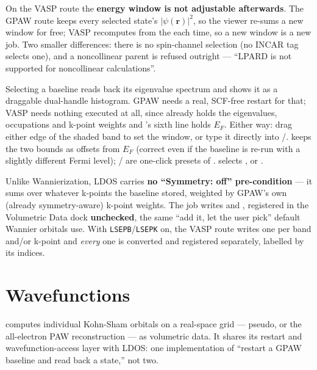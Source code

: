 \begin{calwarn}
On the VASP route the \textbf{energy window is not adjustable afterwards}.
The GPAW route keeps every selected state's $|\psi(\mathbf{r})|^2$, so the
viewer re-sums a new window for free; VASP recomputes from the
 each time, so a new window is a new job. Two smaller
differences: there is no spin-channel selection (no INCAR tag selects one),
and a noncollinear parent is refused outright --- ``LPARD is not supported
for noncollinear calculations''.
\end{calwarn}

Selecting a baseline reads back its eigenvalue spectrum and shows it as a
draggable dual-handle histogram. GPAW needs a real, SCF-free restart for
that; VASP needs nothing executed at all, since  already
holds the eigenvalues, occupations and k-point weights and 's
sixth line holds $E_F$. Either way: drag
either edge of the shaded band to set the window, or type it directly into
/.  keeps the two bounds as
offsets from $E_F$ (correct even if the baseline is re-run with a slightly
different Fermi level); /
are one-click presets of .  selects
,  or .

Unlike Wannierization, LDOS carries \textbf{no ``Symmetry: off'' pre-condition}
--- it sums over whatever k-points the baseline stored, weighted by GPAW's
own (already symmetry-aware) k-point weights. The job writes
 and , registered in the Volumetric Data
dock \textbf{unchecked}, the same ``add it, let the user pick'' default
Wannier orbitals use. With \texttt{LSEPB}/\texttt{LSEPK} on, the VASP route
writes one  per band and/or k-point and \emph{every} one is
converted and registered separately, labelled by its indices.

\section{Wavefunctions}
\label{sec:wavefunctions}

\menusep{} computes individual
Kohn-Sham orbitals on a real-space grid --- pseudo, or the all-electron PAW
reconstruction --- as volumetric data. It shares its restart and
wavefunction-access layer with LDOS: one implementation of ``restart a GPAW
baseline and read back a state,'' not two.

